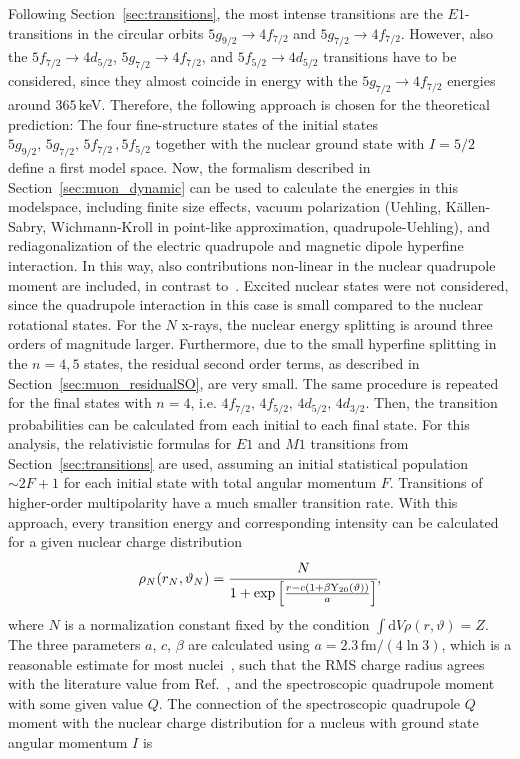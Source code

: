 Following Section~\ref{sec:transitions}, the most intense transitions are the $E1$-transitions in the circular orbits $5g_{9/2}\rightarrow4f_{7/2}$ and $5g_{7/2}\rightarrow4f_{7/2}$. However, also the $5f_{7/2}\rightarrow4d_{5/2}$, $5g_{7/2}\rightarrow 4f_{7/2}$, and $5f_{5/2}\rightarrow 4d_{5/2}$ transitions have to be considered, since they almost coincide in energy with the $5g_{7/2}\rightarrow4f_{7/2}$ energies around $365\,$keV. Therefore, the following approach is chosen for the theoretical prediction: The four fine-structure states of the initial states $5g_{9/2},\,5g_{7/2},\,5f_{7/2}\,,5f_{5/2}$ together with the nuclear ground state with $I=5/2$ define a first model space. Now, the formalism described in Section~\ref{sec:muon_dynamic} can be used to calculate the energies in this modelspace, including finite size effects, vacuum polarization (Uehling, Källen-Sabry, Wichmann-Kroll in point-like approximation, quadrupole-Uehling), and rediagonalization of the electric quadrupole and magnetic dipole hyperfine interaction. In this way, also contributions non-linear in the nuclear quadrupole moment are included, in contrast to~\cite{konijn1979}.
Excited nuclear states were not considered, since the quadrupole interaction in this case is small compared to the nuclear rotational states. For the $N$ x-rays, the nuclear energy splitting is around three orders of magnitude larger. Furthermore, due to the small hyperfine splitting in the ${n}{=}{4,5}$ states, the residual second order terms, as described in Section~\ref{sec:muon_residualSO}, are very small.
The same procedure is repeated for the final states with ${n}{=}{4}$, i.e. $4f_{7/2},\,4f_{5/2},\,4d_{5/2},\,4d_{3/2}$.
Then, the transition probabilities can be calculated from each initial to each final state. For this analysis, the relativistic formulas for $E1$ and $M1$ transitions from Section~\ref{sec:transitions} are used, assuming an initial statistical population $\sim 2F+1$ for each initial state with total angular momentum $F$. Transitions of higher-order multipolarity have a much smaller transition rate. With this approach, every transition energy and corresponding intensity can be calculated for a given nuclear charge distribution
\begin{equation}
\rho_N(r_N,\vartheta_N)=\cfrac{N}{1+\exp\left[\frac{r-c(1+\beta \text{Y}_{20}(\vartheta))}{a}\right]},
\end{equation}
where $N$ is a normalization constant fixed by the condition $\int\text{d}V \rho(r,\vartheta) = Z$.
The three parameters $a$, $c$, $\beta$ are calculated using $a=2.3\,\text{fm}/(4\ln3)$, which is a reasonable estimate for most nuclei~\cite{Beier2000}, such that the RMS charge radius agrees with the literature value from Ref.~\cite{Angeli2013}, and the spectroscopic quadrupole moment with some given value $Q$. The connection of the spectroscopic quadrupole $Q$ moment with the nuclear charge distribution for a nucleus with ground state angular momentum $I$ is
